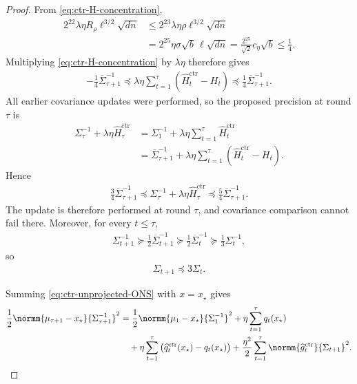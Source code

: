 \begin{proof}
    From \eqref{eq:ctr-H-concentration},
    \begin{align}
        2^{22}\lambda\eta R_\rho\ell^{3/2}\sqrt{dn}
         & \leq
        2^{23}\lambda\eta\rho\ell^{3/2}\sqrt{dn}
        \\
         & =2^{25}\eta\sigma\sqrt b\,\ell\sqrt{dn}
        =\frac{2^{25}}{\sqrt2}c_\eta\sqrt b
        \leq\frac14.
        \label{eq:ctr-H-small}
    \end{align}
    Multiplying \eqref{eq:ctr-H-concentration} by $\lambda\eta$ therefore
    gives
    \begin{align}
        -\frac14\overline\Sigma_{\tau+1}^{-1}
        \preceq
        \lambda\eta\sum_{t=1}^{\tau}
        (\widehat H_t^{\mathrm{ctr}}-H_t)
        \preceq
        \frac14\overline\Sigma_{\tau+1}^{-1}.
        \label{eq:ctr-H-small-matrix}
    \end{align}
    All earlier covariance updates were performed, so the proposed precision
    at round $\tau$ is
    \begin{align}
        \Sigma_\tau^{-1}+\lambda\eta\widehat H_\tau^{\mathrm{ctr}}
         & =\Sigma_1^{-1}
        +\lambda\eta\sum_{t=1}^{\tau}
        \widehat H_t^{\mathrm{ctr}}
        \\
         & =\overline\Sigma_{\tau+1}^{-1}
        +\lambda\eta\sum_{t=1}^{\tau}
        (\widehat H_t^{\mathrm{ctr}}-H_t).
    \end{align}
    Hence
    \begin{align}
        \frac34\overline\Sigma_{\tau+1}^{-1}
        \preceq
        \Sigma_\tau^{-1}+\lambda\eta\widehat H_\tau^{\mathrm{ctr}}
        \preceq
        \frac54\overline\Sigma_{\tau+1}^{-1}.
        \label{eq:ctr-strict-covariance}
    \end{align}
    The update is therefore performed at round $\tau$, and covariance
    comparison cannot fail there.  Moreover, for every $t\leq\tau$,
    \begin{align}
        \Sigma_{t+1}^{-1}
        \succeq\frac12\overline\Sigma_{t+1}^{-1}
        \succeq\frac12\overline\Sigma_t^{-1}
        \succeq\frac13\Sigma_t^{-1},
    \end{align}
    so
    \begin{align}
        \Sigma_{t+1}\preceq3\Sigma_t.
        \label{eq:ctr-next-covariance}
    \end{align}

    Summing \eqref{eq:ctr-unprojected-ONS} with $x=x_\star$ gives
    \begin{align}
        \frac12
        \normm{\mu_{\tau+1}-x_\star}{\Sigma_{\tau+1}^{-1}}^2
         & =\frac12
        \normm{\mu_1-x_\star}{\Sigma_1^{-1}}^2
        +\eta\sum_{t=1}^{\tau}q_t(x_\star)
        \nonumber   \\
         & \quad
        +\eta\sum_{t=1}^{\tau}
        \left(
        \widehat q_t^{\mathrm{ctr}}(x_\star)-q_t(x_\star)
        \right)
        +\frac{\eta^2}{2}
        \sum_{t=1}^{\tau}
        \normm{\widehat g_t^{\mathrm{ctr}}}{\Sigma_{t+1}}^2.
        \label{eq:ctr-focus-decomposition}
    \end{align}


\end{proof}
